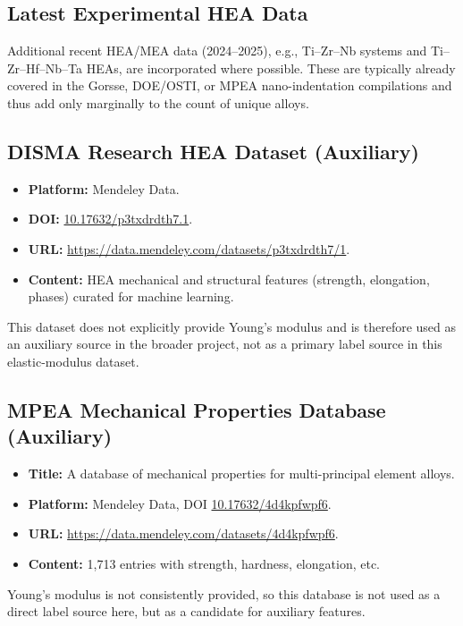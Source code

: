 \documentclass[12pt]{article}
\begin{document}
\subsection{Latest Experimental HEA Data}
Additional recent HEA/MEA data (2024--2025), e.g., Ti--Zr--Nb systems and Ti--Zr--Hf--Nb--Ta HEAs, are incorporated where possible. These are typically already covered in the Gorsse, DOE/OSTI, or MPEA nano-indentation compilations and thus add only marginally to the count of unique alloys.

\subsection{DISMA Research HEA Dataset (Auxiliary)}
\begin{itemize}
  \item \textbf{Platform:} Mendeley Data.
  \item \textbf{DOI:} \href{https://doi.org/10.17632/p3txdrdth7.1}{10.17632/p3txdrdth7.1}.
  \item \textbf{URL:} \url{https://data.mendeley.com/datasets/p3txdrdth7/1}.
  \item \textbf{Content:} HEA mechanical and structural features (strength, elongation, phases) curated for machine learning.
\end{itemize}
This dataset does not explicitly provide Young's modulus and is therefore used as an auxiliary source in the broader project, not as a primary label source in this elastic-modulus dataset.

\subsection{MPEA Mechanical Properties Database (Auxiliary)}
\begin{itemize}
  \item \textbf{Title:} A database of mechanical properties for multi-principal element alloys.
  \item \textbf{Platform:} Mendeley Data, DOI \href{https://doi.org/10.17632/4d4kpfwpf6}{10.17632/4d4kpfwpf6}.
  \item \textbf{URL:} \url{https://data.mendeley.com/datasets/4d4kpfwpf6}.
  \item \textbf{Content:} 1,713 entries with strength, hardness, elongation, etc.
\end{itemize}
Young's modulus is not consistently provided, so this database is not used as a direct label source here, but as a candidate for auxiliary features.
\end{document}
